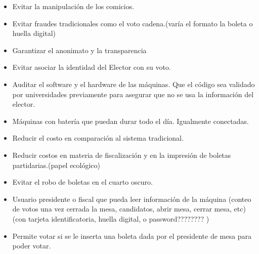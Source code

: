 \documentclass[spanish, 10pt,a4paper]{article}
\numberwithin{equation}{section} %
\begin{document}
\begin{itemize}
\item Evitar la manipulación de los comicios.
\item Evitar fraudes tradicionales como el voto cadena.(varía el formato la boleta o huella digital)
\item Garantizar el anonimato y la transparencia
\item Evitar asociar la identidad del Elector con su voto.
\item Auditar el software y el hardware de las máquinas. Que el código sea validado por universidades previamente para asegurar que no se usa la información del elector.
\item Máquinas con batería que puedan durar todo el día. Igualmente conectadas.
\item Reducir el costo en comparación al sistema tradicional. 
\item Reducir costos en materia de fiscalización y en la impresión de boletas partidarias.(papel ecológico)
\item Evitar el robo de boletas en el cuarto oscuro. 
\item Usuario presidente o fiscal que pueda leer información de la máquina (conteo de votos una vez cerrada la mesa, candidatos, abrir mesa, cerrar mesa, etc) (con tarjeta identificatoria, huella digital,  o password???????? ) 
\item Permite votar si se le inserta una boleta dada por el presidente de mesa para poder votar. 
\end{itemize}
\end{document}
